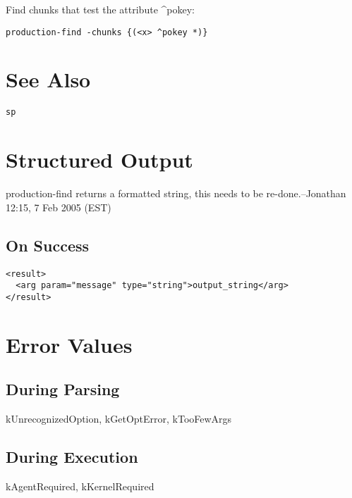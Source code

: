 \documentclass[10pt]{article}
\begin{document}
 Find chunks that test the attribute \^{}pokey: \begin{verbatim}
production-find -chunks {(<x> ^pokey *)}

\end{verbatim}

\section*{ See Also }
\begin{verbatim}
sp

\end{verbatim}
\section*{ Structured Output }


 production-find returns a formatted string, this needs to be re-done.--Jonathan 12:15, 7 Feb 2005 (EST) 
\subsection*{ On Success }
\begin{verbatim}
<result>
  <arg param="message" type="string">output_string</arg>
</result>

\end{verbatim}
\section*{ Error Values }
\subsection*{ During Parsing }


 kUnrecognizedOption, kGetOptError, kTooFewArgs
\subsection*{ During Execution }


 kAgentRequired, kKernelRequired
\end{document}
